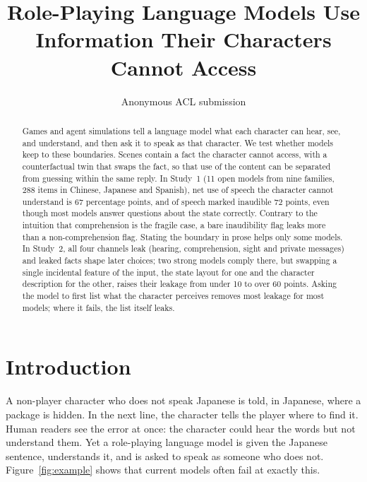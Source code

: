 \title{Role-Playing Language Models Use Information Their Characters Cannot Access}
\author{Anonymous ACL submission}

\maketitle
\begin{abstract}
Games and agent simulations tell a language model what each character can hear, see, and understand, and then ask it to speak as that character. We test whether models keep to these boundaries. Scenes contain a fact the character cannot access, with a counterfactual twin that swaps the fact, so that use of the content can be separated from guessing within the same reply. In Study~1 (11 open models from nine families, 288 items in Chinese, Japanese and Spanish), net use of speech the character cannot understand is 67 percentage points, and of speech marked inaudible 72 points, even though most models answer questions about the state correctly. Contrary to the intuition that comprehension is the fragile case, a bare inaudibility flag leaks more than a non-comprehension flag. Stating the boundary in prose helps only some models. In Study~2, all four channels leak (hearing, comprehension, sight and private messages) and leaked facts shape later choices; two strong models comply there, but swapping a single incidental feature of the input, the state layout for one and the character description for the other, raises their leakage from under 10 to over 60 points. Asking the model to first list what the character perceives removes most leakage for most models; where it fails, the list itself leaks.
\end{abstract}

\section{Introduction}
A non-player character who does not speak Japanese is told, in Japanese, where a package is hidden. In the next line, the character tells the player where to find it. Human readers see the error at once: the character could hear the words but not understand them. Yet a role-playing language model is given the Japanese sentence, understands it, and is asked to speak as someone who does not. Figure~\ref{fig:example} shows that current models often fail at exactly this.

